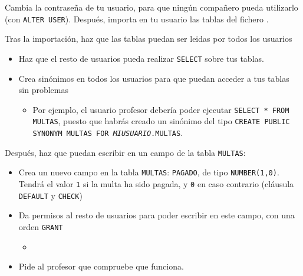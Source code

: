 \begin{homeworkProblem}
  Cambia la contraseña de tu usuario, para que ningún compañero pueda utilizarlo (con \texttt{ALTER USER}). Después, importa en tu usuario las tablas del fichero .

  Tras la importación, haz que las tablas puedan ser leidas por todos los usuarios
  \begin{itemize}
  \item Haz que el resto de usuarios pueda realizar \texttt{SELECT} sobre tus tablas.  
  \item Crea sinónimos en todos los usuarios para que puedan acceder a tus tablas sin problemas
    \begin{itemize}
    \item Por ejemplo, el usuario profesor debería poder ejecutar \texttt{SELECT * FROM MULTAS}, puesto que habrás creado un sinónimo del tipo \texttt{CREATE PUBLIC SYNONYM MULTAS FOR \textit{MIUSUARIO}.MULTAS}.
    \end{itemize}
  \end{itemize}

  Después, haz que puedan escribir en un campo de la tabla \texttt{MULTAS}:
  \begin{itemize}
  \item Crea un nuevo campo en la tabla \texttt{MULTAS}: \texttt{PAGADO}, de tipo \texttt{NUMBER(1,0)}. Tendrá el valor \texttt{1} si la multa ha sido pagada, y \texttt{0} en caso contrario (cláusula \texttt{DEFAULT} y \texttt{CHECK})
    
  \item Da permisos al resto de usuarios para poder escribir en este campo, con una orden \texttt{GRANT}
    \begin{itemize}
    \item {}
    \end{itemize}
    
  \item Pide al profesor que compruebe que funciona.

  \end{itemize}
  

\end{homeworkProblem}


